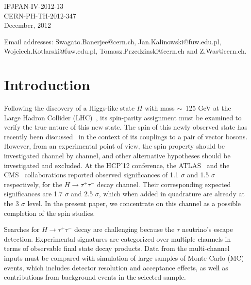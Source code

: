 \documentclass[12pt]{article}
\begin{document}
\begin{titlepage}
 \vspace{1cm}
\begin{flushleft}
{   IFJPAN-IV-2012-13 \\  CERN-PH-TH-2012-347\\
 December, 2012}
\end{flushleft}
 
\vspace*{1mm}
\bigskip
\footnoterule
\noindent
{\footnotesize \noindent%
Email addresses: Swagato.Banerjee@cern.ch, Jan.Kalinowski@fuw.edu.pl, Wojciech.Kotlarski@fuw.edu.pl, Tomasz.Przedzinski@cern.ch and Z.Was@cern.ch.
}
\end{titlepage}



\section {Introduction}

Following the discovery of a Higgs-like state $H$ with mass $\sim$~125 GeV at the Large Hadron Collider (LHC)~\cite{ATLAS_disc,CMS_disc},
its spin-parity assignment must be  examined to verify the true nature of this new state. 
The spin of this newly observed state has recently been discussed~\cite{VB} in the context of its couplings to  a pair of vector bosons.
However, from an experimental point of view, the spin property should be investigated channel by channel, and other alternative hypotheses should be investigated and excluded.  
At the HCP'12 conference, the ATLAS~\cite{ATLAS_HCP} and the CMS~\cite{CMS_HCP} collaborations reported observed significances of 1.1 $\sigma$ and 1.5 $\sigma$ respectively,
for the  $H\to\tau^+\tau^-$  decay channel. Their corresponding expected significances are 1.7 $\sigma$ and 2.5 $\sigma$, 
which when added in quadrature are already at the 3 $\sigma$ level.
In the present paper, we concentrate on this channel as a possible completion of the spin studies.  

Searches for $H\to\tau^+\tau^-$ decay are challenging because the $\tau$ neutrino's escape detection.
Experimental signatures are categorized over multiple channels in terms of  observable final state decay products.
Data from the multi-channel inputs must be compared with simulation of large samples of Monte Carlo (MC) events, 
which includes detector resolution and acceptance effects, as well as contributions from background events in the selected sample.
\end{document}

